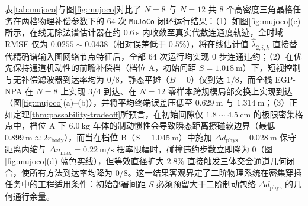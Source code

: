 表\ref{tab:mujoco}与图\ref{fig:mujoco}对比了 $N=8$ 与 $N=12$ 共 $8$ 个高密度三角晶格任务在两档物理补偿参数下的 $64$ 次 \texttt{MuJoCo} 闭环运行结果：（1）如图\ref{fig:mujoco}(c) 所示，在线无除法谱估计器在约 $0.6\ \mathrm s$ 内收敛至真实代数连通度轨迹，全时域 RMSE 仅为 $0.0255\sim 0.0438$（相对误差低于 $0.5\%$），将在线估计值 $\hat\lambda_{2,i,k}$ 直接替代精确谱输入图网络节点特征后，全部 $64$ 次运行均实现 $0$ 步连通违约；（2）在优先保持通道机动性的前瞻补偿档（档位 A，初始间距 $S=1.018\ \mathrm m$）下，短视控制与无补偿滤波器到达率均为 $0/8$，静态平摊（$B=0$）仅到达 $1/8$，而全栈 EGP-NPA 在 $N=8$ 上实现 $3/4$ 到达、在 $N=12$ 零样本跨规模局部交换上实现到达（图\ref{fig:mujoco}(a)--(b)），并将平均终端误差压低至 $0.629\ \mathrm m$ 与 $1.314\ \mathrm m$；（3）正如定理\ref{thm:passability-tradeoff}所预言，在初始间隙仅 $1.8\sim 4.5\ \mathrm{cm}$ 的极限密集格点中，档位 A 下 $6.0\ \mathrm{kg}$ 车体的制动惯性会导致瞬态距离擦碰软边界（最低 $0.899\ \mathrm m\approx 2r_{\mathrm{body}}$），而当在档位 B（$S=1.045\ \mathrm m$）中施加 $\Delta d_{\mathrm{phys}}=0.028\ \mathrm m$ 保守距离内缩与 $\Delta u_{\max}=0.22\ \mathrm{m/s}$ 摆率限幅时，碰撞违约步数立即降为 $0$（图\ref{fig:mujoco}(d) 蓝色实线），但等效直径扩大 $2.8\%$ 直接触发三体交会通道几何闭合，使所有方法到达率均降为 $0/8$。这一结果客观界定了二阶物理系统在密集穿插任务中的工程适用条件：初始部署间距 $S$ 必须预留大于二阶制动包络 $\Delta d_{\mathrm{phys}}$ 的几何通行余量。
